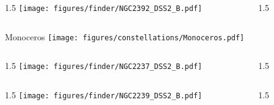 \documentclass[final]{beamer}
\newlength{\colwidth}
\begin{document}

\begin{frame}[t]{}
    \begin{columns}[T]
        \begin{column}{1.5\colwidth}
            \centering
            \texttt{[image: figures/finder/NGC2392\_DSS2\_B.pdf]}
        \end{column}
        \begin{column}{1.5\colwidth}
            \Large
            
        \end{column}
    \end{columns}
    \vspace{\fill}
\end{frame}


\begin{frame}[t]{\LARGE Monoceros}
    \centering
    \texttt{[image: figures/constellations/Monoceros.pdf]}
\end{frame}


\begin{frame}[t]{}
    \begin{columns}[T]
        \begin{column}{1.5\colwidth}
            \centering
            \texttt{[image: figures/finder/NGC2237\_DSS2\_B.pdf]}
        \end{column}
        \begin{column}{1.5\colwidth}
            \Large
            
        \end{column}
    \end{columns}
    \vspace{\fill}
    \begin{columns}[T]
        \begin{column}{1.5\colwidth}
            \centering
            \texttt{[image: figures/finder/NGC2239\_DSS2\_B.pdf]}
        \end{column}
        \begin{column}{1.5\colwidth}
            \Large
            
        \end{column}
    \end{columns}
\end{frame}
\end{document}
